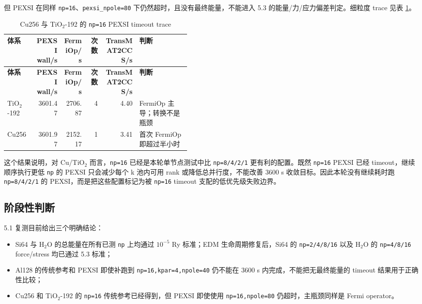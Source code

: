 \documentclass[a4paper,11pt]{article}
\newcommand{\code}[1]{\texttt{#1}}
\begin{document}
但 PEXSI 在同样 \code{np=16}、\code{pexsi\_npole=80} 下仍然超时，且没有最终能量，不能进入 5.3 的能量/力/应力偏差判定。细粒度 trace 见表 \ref{tab:cu-tio2-trace}。

{\scriptsize
\begin{longtable}{@{}p{0.16\linewidth}r r r r p{0.28\linewidth}@{}}
\caption{Cu256 与 TiO\(_2\)-192 的 \code{np=16} PEXSI timeout trace}
\label{tab:cu-tio2-trace}\\
\toprule
\textbf{体系} & \textbf{PEXSI wall/s} & \textbf{FermiOp/s} & \textbf{次数} & \textbf{TransMAT2CCS/s} & \textbf{判断}\\
\midrule
\endfirsthead
\toprule
\textbf{体系} & \textbf{PEXSI wall/s} & \textbf{FermiOp/s} & \textbf{次数} & \textbf{TransMAT2CCS/s} & \textbf{判断}\\
\midrule
\endhead
TiO\(_2\)-192 & 3601.47 & 2706.87 & 4 & 4.40 & FermiOp 主导；转换不是瓶颈\\
Cu256 & 3601.97 & 2152.17 & 1 & 3.41 & 首次 FermiOp 即超过半小时\\
\bottomrule
\end{longtable}
}

这个结果说明，对 Cu/TiO\(_2\) 而言，\code{np=16} 已经是本轮单节点测试中比 \code{np=8/4/2/1} 更有利的配置。既然 \code{np=16} PEXSI 已经 timeout，继续顺序执行更低 \code{np} 的 PEXSI 只会减少每个 k 池内可用 rank 或降低总并行度，不能改善 3600 s 收敛目标。因此本轮没有继续耗时跑 \code{np=8/4/2/1} 的 PEXSI，而是把这些配置标记为被 \code{np=16} timeout 支配的低优先级失败边界。

\subsection{阶段性判断}

5.1 复测目前给出三个明确结论：

\begin{itemize}
    \item Si64 与 H\(_2\)O 的总能量在所有已测 \code{np} 上均通过 \(10^{-5}\) Ry 标准；EDM 生命周期修复后，Si64 的 \code{np=2/4/8/16} 以及 H\(_2\)O 的 \code{np=4/8/16} force/stress 均已通过 5.3 标准；
    \item Al128 的传统参考和 PEXSI 即使补跑到 \code{np=16,kpar=4,npole=40} 仍不能在 3600 s 内完成，不能把无最终能量的 timeout 结果用于正确性比较；
    \item Cu256 和 TiO\(_2\)-192 的 \code{np=16} 传统参考已经得到，但 PEXSI 即使使用 \code{np=16,npole=80} 仍超时，主瓶颈同样是 Fermi operator。
\end{itemize}
\end{document}

